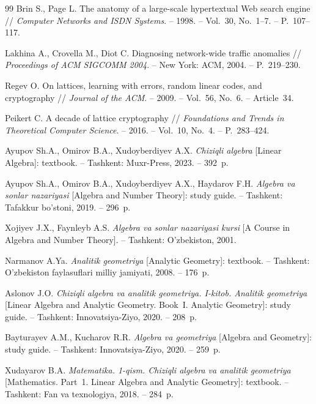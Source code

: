 \begin{thebibliography}{99}
Brin S., Page L. The anatomy of a large-scale hypertextual Web search
engine // \textit{Computer Networks and ISDN Systems}. – 1998. – Vol.~30,
No.~1–7. – P.~107–117.

Lakhina A., Crovella M., Diot C. Diagnosing network-wide traffic
anomalies // \textit{Proceedings of ACM SIGCOMM 2004}. – New York: ACM,
2004. – P.~219–230.

Regev O. On lattices, learning with errors, random linear codes, and
cryptography // \textit{Journal of the ACM}. – 2009. – Vol.~56, No.~6. –
Article~34.

Peikert C. A decade of lattice cryptography // \textit{Foundations and
Trends in Theoretical Computer Science}. – 2016. – Vol.~10, No.~4. –
P.~283–424.


Ayupov Sh.A., Omirov B.A., Xudoyberdiyev A.X. \textit{Chiziqli algebra}
[Linear Algebra]: textbook. – Tashkent: Muxr-Press, 2023. – 392~p.

Ayupov Sh.A., Omirov B.A., Xudoyberdiyev A.X., Haydarov F.H.
\textit{Algebra va sonlar nazariyasi} [Algebra and Number Theory]: study
guide. – Tashkent: Tafakkur bo’stoni, 2019. – 296~p.

Xojiyev J.X., Faynleyb A.S. \textit{Algebra va sonlar nazariyasi kursi}
[A Course in Algebra and Number Theory]. – Tashkent: O’zbekiston, 2001.

Narmanov A.Ya. \textit{Analitik geometriya} [Analytic Geometry]: textbook. –
Tashkent: O’zbekiston faylasuflari milliy jamiyati, 2008. – 176~p.

Aslonov J.O. \textit{Chiziqli algebra va analitik geometriya. I-kitob.
Analitik geometriya} [Linear Algebra and Analytic Geometry. Book~I.
Analytic Geometry]: study guide. – Tashkent: Innovatsiya-Ziyo, 2020. –
208~p.

Bayturayev A.M., Kucharov R.R. \textit{Algebra va geometriya} [Algebra and
Geometry]: study guide. – Tashkent: Innovatsiya-Ziyo, 2020. – 259~p.

Xudayarov B.A. \textit{Matematika. 1-qism. Chiziqli algebra va analitik
geometriya} [Mathematics. Part~1. Linear Algebra and Analytic Geometry]:
textbook. – Tashkent: Fan va texnologiya, 2018. – 284~p.


\end{thebibliography}

